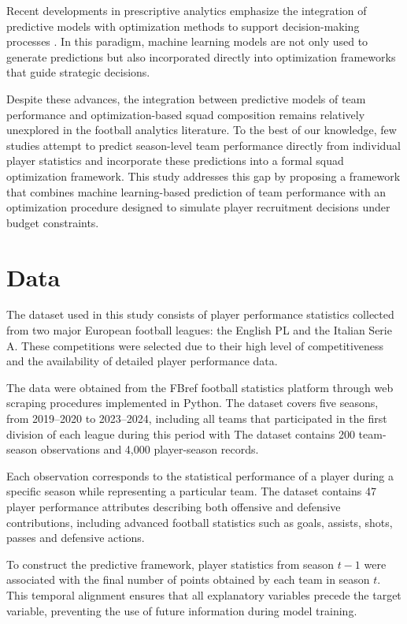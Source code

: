 \documentclass[12pt]{article}
\begin{document}
Recent developments in prescriptive analytics emphasize the integration of predictive models with optimization methods to support decision-making processes 
\cite{Bertsimas2019}. In this paradigm, machine learning models are not only used to generate predictions but also incorporated directly 
into optimization frameworks that guide strategic decisions.

Despite these advances, the integration between predictive models of team performance and optimization-based squad composition remains 
relatively unexplored in the football analytics literature. To the best of our knowledge, few studies attempt to predict season-level team 
performance directly from individual player statistics and incorporate these predictions into a formal squad optimization framework.
This study addresses this gap by proposing a framework that combines machine learning-based prediction of team performance with an 
optimization procedure designed to simulate player recruitment decisions under budget constraints.

\section{Data}

The dataset used in this study consists of player performance statistics collected from two major European football leagues: the English PL
and the Italian Serie A. These competitions were selected due to their high level of competitiveness and the availability of detailed player performance data.

The data were obtained from the FBref football statistics platform through web scraping procedures implemented in Python. The dataset covers five seasons, 
from 2019--2020 to 2023--2024, including all teams that participated in the first division of each league during this period with
The dataset contains 200 team-season observations and 4,000 player-season records.

Each observation corresponds to the statistical performance of a player during a specific season while representing a particular team. The dataset contains 
47 player performance attributes describing both offensive and defensive contributions, including advanced football statistics such as goals, 
assists, shots, passes and defensive actions.

To construct the predictive framework, player statistics from season \(t-1\) were associated with the final number of points obtained by each team in
season \(t\). This temporal alignment ensures that all explanatory variables precede the target variable, preventing the use of future information during
model training.
\end{document}
